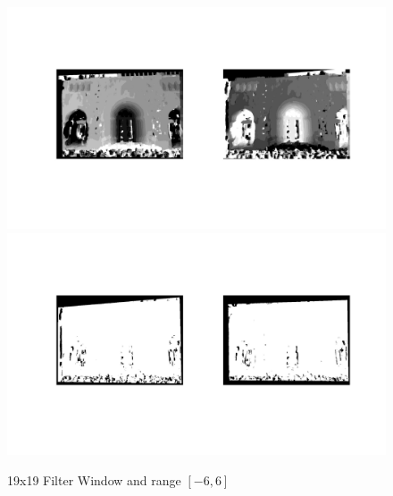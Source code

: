 \documentclass[12pt]{article}
\begin{document}
\begin{figure}[H]
	\centering
	\includegraphics[width=1.1\textwidth]{1.jpg}
	\includegraphics[width=1.1\textwidth]{2.jpg}
	\caption{19x19 Filter Window and range $[-6,6]$}
	\label{fig1}
\end{figure}
\end{document}
